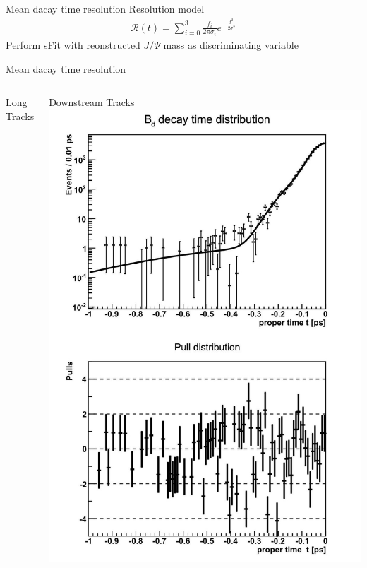 \documentclass{beamer}
\begin{document}
	\begin{frame}{Mean dacay time resolution}
	Resolution model
	\begin{align}
	\mathcal{R}(t) = \sum_{i=0}^3 \frac{f_i}{2\pi\sigma_i}e^{-\tfrac{t^2}{2\sigma^2}}
	\end{align}
	Perform sFit with reonstructed $J/\Psi$ mass as discriminating variable
	\end{frame}
	\begin{frame}{Mean dacay time resolution}
		\begin{columns}
	\begin{block}{Long Tracks}
	\end{block}
	\begin{block}{Downstream Tracks}
	\includegraphics[width=\textwidth]{resolution_ds}
	\end{block}
	\end{columns}
	\end{frame}
\end{document}
